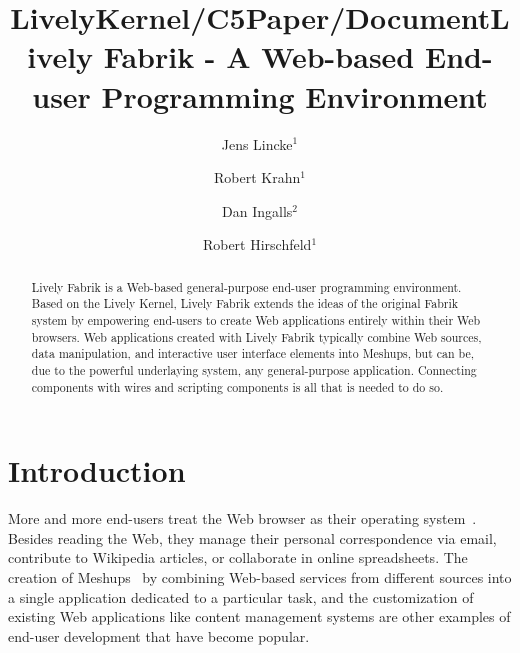\documentclass[pdftex, times, 10pt, twocolumn]{article}
\title{LivelyKernel/C5Paper/Document}
\author{ }
\date{ }
\begin{document}
\title{Lively Fabrik - A Web-based End-user Programming Environment}

\author{%
Jens Lincke$^1$  \\
\and
Robert Krahn$^1$\\
\and
Dan Ingalls$^2$\\
\and
Robert Hirschfeld$^1$\\
}


\maketitle
\thispagestyle{empty}


 

\begin{abstract} 

Lively Fabrik is a Web-based general-purpose end-user programming environment. Based on the Lively Kernel, Lively Fabrik extends the ideas of the original Fabrik system by empowering end-users to create Web applications entirely within their Web browsers. Web applications created with Lively Fabrik typically combine Web sources, data manipulation, and interactive user interface elements into Meshups, but can be, due to the powerful underlaying system, any general-purpose application. Connecting components with wires and scripting components is all that is needed to do so.  

\end{abstract} 



\section{Introduction}
More and more end-users treat the Web browser as their operating system~\cite{Taivalsaari2008TLKE}. Besides reading the Web, they manage their personal correspondence via email, contribute to Wikipedia articles, or collaborate in online spreadsheets. The creation of Meshups~\cite{Merrill2006MNB} by combining Web-based services from different sources into a single application dedicated to a particular task, and the customization of existing Web applications like content management systems are other examples of end-user development that have become popular.  
\end{document}
